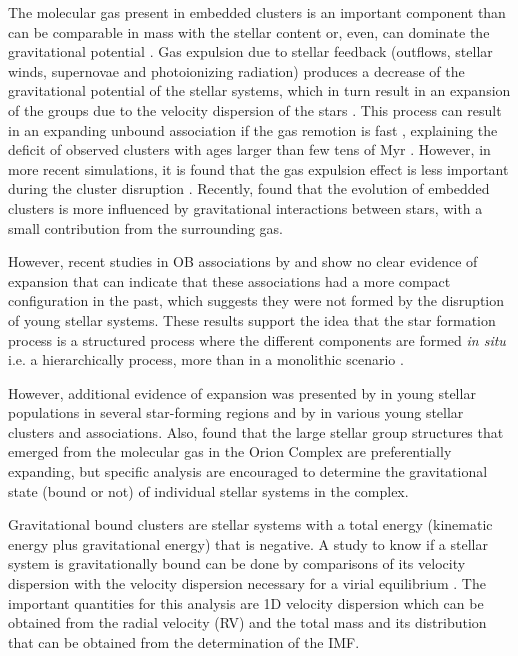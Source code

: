 \documentclass[12pt]{article}
\begin{document}
The molecular gas present in embedded clusters is an important component than can be comparable in mass with the stellar content \citep[in the DR21 region; ][]{Schneider2010} or, even, can dominate the gravitational potential \citep[in the Orion Nebula Cluster, \ac{ONC}, except in the inner region; ][]{Stutz2018}. Gas expulsion due to stellar feedback (outflows, stellar winds, supernovae and photoionizing radiation) produces a decrease of the gravitational potential of the stellar systems, which in turn result in an expansion of the groups due to the velocity dispersion of the stars \citep{Baumgardt-Kroupa2007}. This process can result in an expanding unbound association if the gas remotion is fast \citep{Goodwin-Bastian2006}, explaining the deficit of observed clusters with ages larger than few tens of Myr \citep{Lada-Lada2003}. However, in more recent simulations, it is found that the gas expulsion effect is less important during the cluster disruption \citep{Parker-Dale2013,Dale2015}. Recently, \citet{Sills2018} found that the evolution of embedded clusters is more influenced by gravitational interactions between stars, with a small contribution from the surrounding gas.

However, recent studies in OB associations by \citet{Wright-Mamajek2018} and \citet{Ward-Kruijssen2018} show no clear evidence of expansion that can indicate that these associations had a more compact configuration in the past, which suggests they were not formed by the disruption of young stellar systems. These results support the idea that the star formation process is a structured process where the different components are formed \textit{in situ} i.e. a hierarchically process, more than in a monolithic scenario \citep[see the review by ][]{Gouliermis2018}.

However, additional evidence of expansion was presented by \citet{Getman2018} in young stellar populations in several star-forming regions and by \citet{Kuhn2018} in various young stellar clusters and associations. Also, \citet{Kounkel2018} found that the large stellar group structures that emerged from the molecular gas in the Orion Complex are preferentially expanding, but specific analysis are encouraged to determine the gravitational state (bound or not) of individual stellar systems in the complex.

Gravitational bound clusters are stellar systems with a total energy (kinematic energy plus gravitational energy) that is negative. A study to know if a stellar system is gravitationally bound can be done by comparisons of its velocity dispersion with the velocity dispersion necessary for a virial equilibrium \citep[e.g. ][]{Kuhn2018}. The important quantities for this analysis are 1D velocity dispersion which can be obtained from the radial velocity (\ac{RV}) and the total mass and its distribution that can be obtained from the determination of the IMF.
\end{document}
